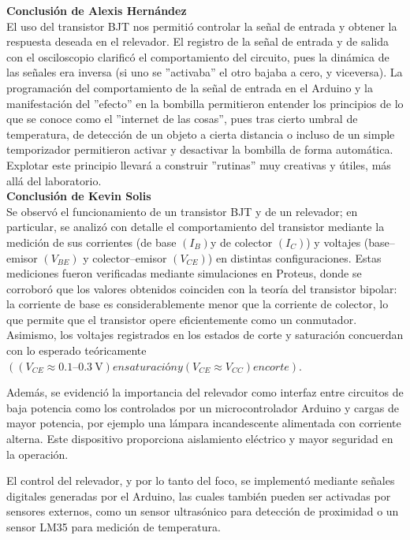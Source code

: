 \textbf{Conclusión de Alexis Hernández}\\
\noindent El uso del transistor BJT nos permitió controlar la señal de entrada y obtener la respuesta deseada en el relevador. El registro de la señal de entrada y de salida con el osciloscopio clarificó el comportamiento del circuito, pues la dinámica de las señales era inversa (si uno se ''activaba'' el otro bajaba a cero, y viceversa). 
La programación del comportamiento de la señal de entrada en el Arduino y la manifestación del ''efecto'' en la bombilla permitieron entender los principios de lo que se conoce como el ''internet de las cosas'', pues tras cierto umbral de temperatura, de detección de un objeto a cierta distancia o incluso de un simple temporizador permitieron activar y desactivar la bombilla de forma automática. Explotar este principio llevará a construir ''rutinas'' muy creativas y útiles, más allá del laboratorio.\\

\textbf{Conclusión de Kevin Solis}\\ 
\noindent Se observó el funcionamiento de un transistor BJT y de un relevador; en particular, se analizó con detalle el comportamiento del transistor mediante la medición de sus corrientes (de base $(I_B)$y de colector $(I_C)$) y voltajes (base–emisor $(V_{BE})$ y colector–emisor $(V_{CE})$) en distintas configuraciones. Estas mediciones fueron verificadas mediante simulaciones en Proteus, donde se corroboró que los valores obtenidos coinciden con la teoría del transistor bipolar: la corriente de base es considerablemente menor que la corriente de colector, lo que permite que el transistor opere eficientemente como un conmutador. Asimismo, los voltajes registrados en los estados de corte y saturación concuerdan con lo esperado teóricamente $((V_{CE} \approx 0.1\text{–}0.3\ \mathrm{V}) en saturación y (V_{CE} \approx V_{CC}) en corte)$.

Además, se evidenció la importancia del relevador como interfaz entre circuitos de baja potencia como los controlados por un microcontrolador Arduino y cargas de mayor potencia, por ejemplo una lámpara incandescente alimentada con corriente alterna. Este dispositivo proporciona aislamiento eléctrico y mayor seguridad en la operación. 

El control del relevador, y por lo tanto del foco, se implementó mediante señales digitales generadas por el Arduino, las cuales también pueden ser activadas por sensores externos, como un sensor ultrasónico para detección de proximidad o un sensor LM35 para medición de temperatura.
\\

